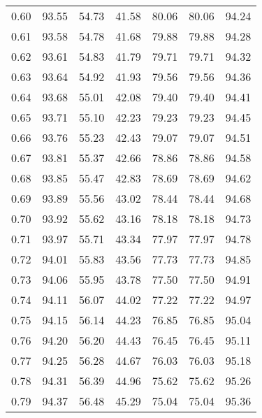 \begin{tabular}{|c|c|c|c|c|c|c|}
      0.60 &     93.55 &     54.73 &      41.58 &   80.06 &      80.06 &         94.24 \\
      0.61 &     93.58 &     54.78 &      41.68 &   79.88 &      79.88 &         94.28 \\
      0.62 &     93.61 &     54.83 &      41.79 &   79.71 &      79.71 &         94.32 \\
      0.63 &     93.64 &     54.92 &      41.93 &   79.56 &      79.56 &         94.36 \\
      0.64 &     93.68 &     55.01 &      42.08 &   79.40 &      79.40 &         94.41 \\
      0.65 &     93.71 &     55.10 &      42.23 &   79.23 &      79.23 &         94.45 \\
      0.66 &     93.76 &     55.23 &      42.43 &   79.07 &      79.07 &         94.51 \\
      0.67 &     93.81 &     55.37 &      42.66 &   78.86 &      78.86 &         94.58 \\
      0.68 &     93.85 &     55.47 &      42.83 &   78.69 &      78.69 &         94.62 \\
      0.69 &     93.89 &     55.56 &      43.02 &   78.44 &      78.44 &         94.68 \\
      0.70 &     93.92 &     55.62 &      43.16 &   78.18 &      78.18 &         94.73 \\
      0.71 &     93.97 &     55.71 &      43.34 &   77.97 &      77.97 &         94.78 \\
      0.72 &     94.01 &     55.83 &      43.56 &   77.73 &      77.73 &         94.85 \\
      0.73 &     94.06 &     55.95 &      43.78 &   77.50 &      77.50 &         94.91 \\
      0.74 &     94.11 &     56.07 &      44.02 &   77.22 &      77.22 &         94.97 \\
      0.75 &     94.15 &     56.14 &      44.23 &   76.85 &      76.85 &         95.04 \\
      0.76 &     94.20 &     56.20 &      44.43 &   76.45 &      76.45 &         95.11 \\
      0.77 &     94.25 &     56.28 &      44.67 &   76.03 &      76.03 &         95.18 \\
      0.78 &     94.31 &     56.39 &      44.96 &   75.62 &      75.62 &         95.26 \\
      0.79 &     94.37 &     56.48 &      45.29 &   75.04 &      75.04 &         95.36 \\

\end{tabular}
